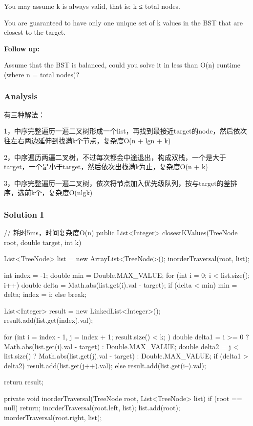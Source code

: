 You may assume k is always valid, that is: k ≤ total nodes.

You are guaranteed to have only one unique set of k values in the BST that are closest to the target.

\textbf{Follow up:}

Assume that the BST is balanced, could you solve it in less than O(n) runtime (where n = total nodes)?

\subsubsection{Analysis}
有三种解法：

1，中序完整遍历一遍二叉树形成一个list，再找到最接近target的node，然后依次往左右两边延伸到找满k个节点，复杂度O(n + lgn + k)

2，中序遍历两遍二叉树，不过每次都会中途退出，构成双栈，一个是大于target，一个是小于target，然后依次出栈满k为止，复杂度O(n + k)

3，中序完整遍历一遍二叉树，依次将节点加入优先级队列，按与target的差排序，选前k个，复杂度O(nlgk)

\newpage

\subsubsection{Solution I}

\begin{Code}
// 耗时5ms，时间复杂度O(n)
public List<Integer> closestKValues(TreeNode root, double target, int k) {
    List<TreeNode> list = new ArrayList<TreeNode>();
    inorderTraversal(root, list);

    int index = -1;
    double min = Double.MAX_VALUE;
    for (int i = 0; i < list.size(); i++) {
        double delta = Math.abs(list.get(i).val - target);
        if (delta < min) {
            min = delta;
            index = i;
        } else {
            break;
        }
    }

    List<Integer> result = new LinkedList<Integer>();
    result.add(list.get(index).val);

    for (int i = index - 1, j = index + 1; result.size() < k; ) {
        double delta1 = i >= 0 ? Math.abs(list.get(i).val - target) : Double.MAX_VALUE;
        double delta2 = j < list.size() ? Math.abs(list.get(j).val - target) : Double.MAX_VALUE;
        if (delta1 > delta2) {
            result.add(list.get(j++).val);
        } else {
            result.add(list.get(i--).val);
        }
    }

    return result;
}

private void inorderTraversal(TreeNode root, List<TreeNode> list) {
    if (root == null) {
        return;
    }
    inorderTraversal(root.left, list);
    list.add(root);
    inorderTraversal(root.right, list);
}
\end{Code}

